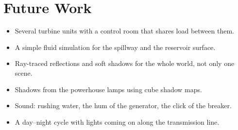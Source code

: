 \documentclass[11pt,a4paper]{report}
\begin{document}
\section{Future Work}

\begin{itemize}
  \item Several turbine units with a control room that shares load between them.
  \item A simple fluid simulation for the spillway and the reservoir surface.
  \item Ray-traced reflections and soft shadows for the whole world, not only one scene.
  \item Shadows from the powerhouse lamps using cube shadow maps.
  \item Sound: rushing water, the hum of the generator, the click of the breaker.
  \item A day--night cycle with lights coming on along the transmission line.
\end{itemize}
\end{document}
